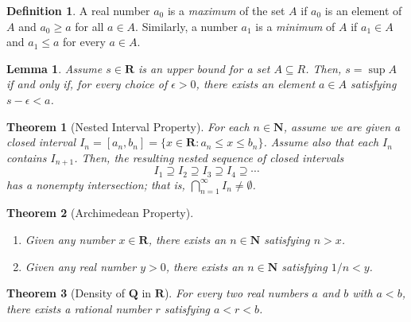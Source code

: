 \documentclass{amsart}
\newtheorem*{theorem}{Theorem}
\newtheorem*{lemma}{Lemma}
\theoremstyle{definition}
\newtheorem*{definition}{Definition}
\newcommand{\N}{\mathbf{N}}
\newcommand{\Q}{\mathbf{Q}}
\newcommand{\R}{\mathbf{R}}
\newcommand{\st}{\mathrel{:}}
\begin{document}
\begin{definition}
  A real number $a_0$ is a \emph{maximum} of the set $A$ if $a_0$ is an element
  of $A$ and $a_0 \ge a$ for all $a \in A$. Similarly, a number $a_1$ is a
  \emph{minimum} of $A$ if $a_1 \in A$ and $a_1 \le a$ for every $a \in A$.
\end{definition}

\begin{lemma}
  Assume $s \in \R$ is an upper bound for a set $A \subseteq R$. Then, $s =
  \sup{A}$ if and only if, for every choice of $\epsilon > 0$, there exists an
  element $a \in A$ satisfying $s - \epsilon < a$.
\end{lemma}

\begin{theorem}[Nested Interval Property]
  For each $n \in \N$, assume we are given a closed interval $I_n = [a_n, b_n] =
  \{x \in \R \st a_n \le x \le b_n\}$. Assume also that each $I_n$ contains
  $I_{n+1}$. Then, the resulting nested sequence of closed intervals
  \[
    I_1 \supseteq I_2 \supseteq I_3 \supseteq I_4 \supseteq \cdots
  \]
  has a nonempty intersection; that is, $\bigcap_{n=1}^{\infty} I_n \neq
  \emptyset$.
\end{theorem}

\begin{theorem}[Archimedean Property]
  \begin{enumerate}[label={(\roman*)}]
    \item Given any number $x \in \R$, there exists an $n \in \N$ satisfying $n
      > x$.
    \item Given any real number $y > 0$, there exists an $n \in \N$ satisfying
      $1/n < y$.
  \end{enumerate}
\end{theorem}

\begin{theorem}[Density of $\Q$ in $\R$]
  For every two real numbers $a$ and $b$ with $a < b$, there exists a rational
  number $r$ satisfying $a < r < b$.
\end{theorem}
\end{document}
